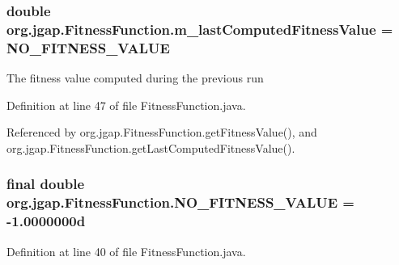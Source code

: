 \hypertarget{classorg_1_1jgap_1_1_fitness_function_a80e29e5b948a1a6ed10c94965abf79a7}{
\subsubsection[{m\-\_\-last\-Computed\-Fitness\-Value}]{\setlength{\rightskip}{0pt plus 5cm}double org.\-jgap.\-Fitness\-Function.\-m\-\_\-last\-Computed\-Fitness\-Value = {\bf N\-O\-\_\-\-F\-I\-T\-N\-E\-S\-S\-\_\-\-V\-A\-L\-U\-E}\hspace{0.3cm}{\ttfamily [private]}}}\label{classorg_1_1jgap_1_1_fitness_function_a80e29e5b948a1a6ed10c94965abf79a7}
The fitness value computed during the previous run 

Definition at line 47 of file Fitness\-Function.\-java.



Referenced by org.\-jgap.\-Fitness\-Function.\-get\-Fitness\-Value(), and org.\-jgap.\-Fitness\-Function.\-get\-Last\-Computed\-Fitness\-Value().

\hypertarget{classorg_1_1jgap_1_1_fitness_function_a5f1f23e6f8a0f9606aee5d52fac6a06b}{
\subsubsection[{N\-O\-\_\-\-F\-I\-T\-N\-E\-S\-S\-\_\-\-V\-A\-L\-U\-E}]{\setlength{\rightskip}{0pt plus 5cm}final double org.\-jgap.\-Fitness\-Function.\-N\-O\-\_\-\-F\-I\-T\-N\-E\-S\-S\-\_\-\-V\-A\-L\-U\-E = -\/1.\-0000000d\hspace{0.3cm}{\ttfamily [static]}}}\label{classorg_1_1jgap_1_1_fitness_function_a5f1f23e6f8a0f9606aee5d52fac6a06b}


Definition at line 40 of file Fitness\-Function.\-java.



